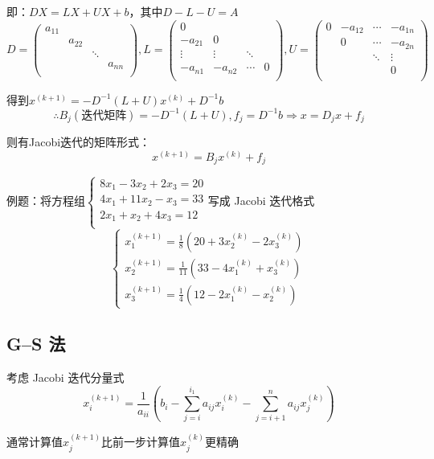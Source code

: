\documentclass[UTF8,a4paper,11pt,oneside]{ctexbook}
\begin{document}
即：\(DX=LX+UX+b\)，其中\(D-L-U=A\)
\[
D=\begin{pmatrix}
    a_{11} & & & \\
    & a_{22} & &\\
    & & \ddots &\\
    & & & a_{nn}\\
\end{pmatrix},
L=\begin{pmatrix}
    0 & & &\\
    -a_{21} & 0 & &\\
    \vdots & \vdots & \ddots &\\
    -a_{n1} & -a_{n2} & \cdots & 0\\
\end{pmatrix},
U=\begin{pmatrix}
    0 & -a_{12} & \cdots & -a_{1n}\\
    & 0 & \cdots & -a_{2n}\\
    & & \ddots & \vdots\\
    & & & 0\\
\end{pmatrix}
\]

得到\(x^{(k+1)}=-D^{-1}(L+U)x^{(k)}+D^{-1}b\)
\[
\therefore B_j(\text{迭代矩阵})=-D^{-1}(L+U),f_j=D^{-1}b\Rightarrow x=D_jx+f_j
\]

则有Jacobi迭代的矩阵形式：
\[
x^{(k+1)}=B_jx^{(k)}+f_j
\]

例题：将方程组\(\begin{cases}
    8x_1-3x_2+2x_3=20\\
    4x_1+11x_2-x_3=33\\
    2x_1+x_2+4x_3=12\\
\end{cases}\)写成 Jacobi 迭代格式
\[
\begin{cases}
    x_1^{(k+1)}=\frac{1}{8}(20+3x_2^{(k)}-2x_3^{(k)})\\
    x_2^{(k+1)}=\frac{1}{11}(33-4x_1^{(k)}+x_3^{(k)})\\
    x_3^{(k+1)}=\frac{1}{4}(12-2x_1^{(k)}-x_2^{(k)})
\end{cases}
\]

\subsection{G--S 法}

考虑 Jacobi 迭代分量式
\[
x_i^{(k+1)}=\frac{1}{a_{ii}}\left(b_i-\sum_{j=i}^{i_1}a_{ij}x_i^{(k)}-\sum_{j=i+1}^na_{ij}x_j^{(k)}\right)
\]

通常计算值\(x_j^{(k+1)}\)比前一步计算值\(x_j^{(k)}\)更精确
\end{document}
